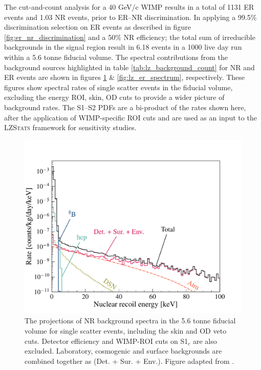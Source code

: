 The cut-and-count analysis for a 40 GeV/c\squared{} WIMP results in a total of 1131 ER events and 1.03 NR events, prior to ER--NR discrimination. In applying a 99.5\% discrimination selection on ER events as described in figure \ref{fig:er_nr_discrimination} and a 50\% NR efficiency; the total sum of irreducible backgrounds in the signal region result in 6.18 events in a 1000 live day run within a 5.6 tonne fiducial volume. The spectral contributions from the background sources highlighted in table \ref{tab:lz_background_count} for NR and ER events are shown in figures \ref{fig:lz_nr_spectrum} \& \ref{fig:lz_er_spectrum}, respectively. These figures show spectral rates of single scatter events in the fiducial volume, excluding the energy ROI, skin, OD cuts to provide a wider picture of background rates. The S1--S2 PDFs are a bi-product of the rates shown here, after the application of WIMP-specific ROI cuts and are used as an input to the \textsc{LZStats} framework for sensitivity studies.

%
\begin{figure}[h]
    \centering
    \includegraphics[scale=0.5]{Chapter_5/Figures/nr_background_spectrum.pdf}
    \caption[The projections of NR background spectra in the 5.6 tonne fiducial volume for single scatter events, including the skin and OD veto cuts.]%
    {The projections of NR background spectra in the 5.6 tonne fiducial volume for single scatter events, including the skin and OD veto cuts. Detector efficiency and WIMP-ROI cuts on S1$_{c}$ are also excluded. Laboratory, cosmogenic and surface backgrounds are combined together as (Det. + Sur. + Env.). Figure adapted from \cite{akerib2018projected}.}
    \label{fig:lz_nr_spectrum}
\end{figure}
%

